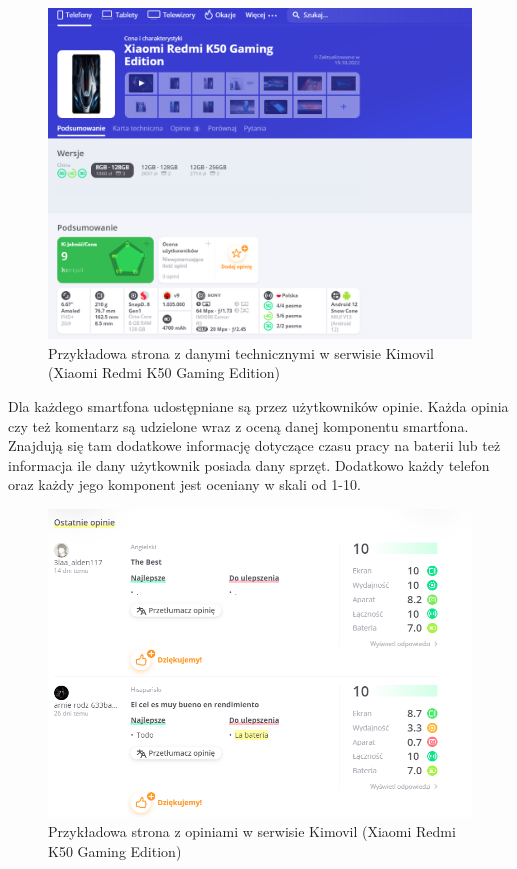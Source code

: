 \begin{figure}[H]
    \centering
    \includegraphics[width=15cm]{img/Kimovil/kimovilDetails.png}
    \caption{Przykładowa strona z danymi technicznymi w serwisie Kimovil (Xiaomi Redmi K50 Gaming Edition)}
    \label{kimovil_3}
\end{figure}
Dla każdego smartfona udostępniane są przez użytkowników opinie. Każda opinia czy też komentarz są udzielone wraz z oceną danej komponentu smartfona. Znajdują się tam dodatkowe informację dotyczące czasu pracy na baterii lub też informacja ile dany użytkownik posiada dany sprzęt. Dodatkowo każdy telefon oraz każdy jego komponent jest oceniany w skali od 1-10.
\begin{figure}[H]
    \centering
    \includegraphics[width=15cm]{img/Kimovil/opinieKimovil.png}
    \caption{Przykładowa strona z opiniami w serwisie Kimovil (Xiaomi Redmi K50 Gaming Edition)}
    \label{kimovil_4}
\end{figure}
